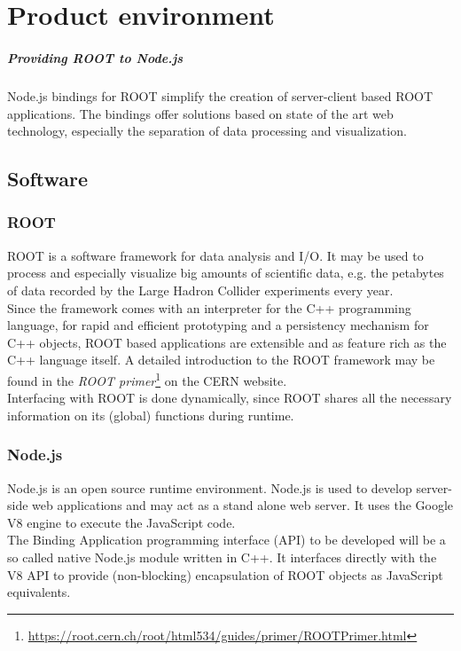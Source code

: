 \chapter{Product environment}

\paragraph{Providing ROOT to Node.js}
Node.js bindings for ROOT simplify the creation of server-client based ROOT applications. The bindings offer solutions based on state of the art web technology, especially the separation of data 
processing and visualization.\\

\section{Software}
\subsection{ROOT}
ROOT is a software framework for data analysis and I/O. It may be used to process and especially visualize big amounts of scientific data, e.g. the petabytes of data recorded by the Large Hadron Collider experiments every year.\\
Since the framework comes with an interpreter for the C++ programming language, for rapid and efficient prototyping and a persistency mechanism for C++ objects, ROOT based applications are  extensible and as feature rich as the C++ language itself.
A detailed introduction to the ROOT framework may be found in the \textit{ROOT  primer}\footnote[1]{\url{https://root.cern.ch/root/html534/guides/primer/ROOTPrimer.html}}
on the CERN website.\\
Interfacing with ROOT is done dynamically, since ROOT shares all the necessary information on its (global) functions during runtime.

\subsection{Node.js}
Node.js is an open source runtime environment. Node.js is used to develop server-side web applications and may act as a 
stand alone web server. It uses the Google V8 engine to execute the JavaScript code. \\
The Binding Application programming interface (API) to be developed will be a so called native Node.js module written in C++. It interfaces directly with the V8 API to provide (non-blocking) encapsulation of ROOT objects as JavaScript equivalents.

